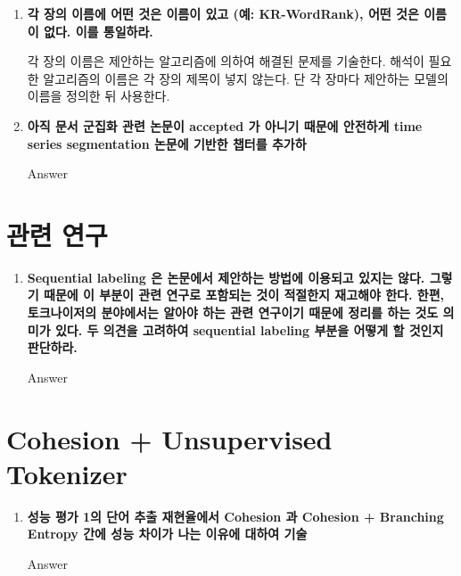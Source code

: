 \documentclass[11pt]{article}
\begin{document}
\begin{enumerate}
\item \textbf{각 장의 이름에 어떤 것은 이름이 있고 (예: KR-WordRank), 어떤 것은 이름이 없다. 이를 통일하라.}

각 장의 이름은 제안하는 알고리즘에 의하여 해결된 문제를 기술한다. 해석이 필요한 알고리즘의 이름은 각 장의 제목이 넣지 않는다. 단 각 장마다 제안하는 모델의 이름을 정의한 뒤 사용한다.

\item \textbf{아직 문서 군집화 관련 논문이 accepted 가 아니기 때문에 안전하게 time series segmentation 논문에 기반한 챕터를 추가하}

Answer


\end{enumerate}



\section{관련 연구}
\begin{enumerate}
\item \textbf{Sequential labeling 은 논문에서 제안하는 방법에 이용되고 있지는 않다. 그렇기 때문에 이 부분이 관련 연구로 포함되는 것이 적절한지 재고해야 한다. 한편, 토크나이저의 분야에서는 알아야 하는 관련 연구이기 때문에 정리를 하는 것도 의미가 있다. 두 의견을 고려하여 sequential labeling 부분을 어떻게 할 것인지 판단하라.}

Answer

\end{enumerate}



\section{Cohesion + Unsupervised Tokenizer}
\begin{enumerate}
\item \textbf{성능 평가 1의 단어 추출 재현율에서 Cohesion 과 Cohesion + Branching Entropy 간에 성능 차이가 나는 이유에 대하여 기술}

Answer

\end{enumerate}
\end{document}
